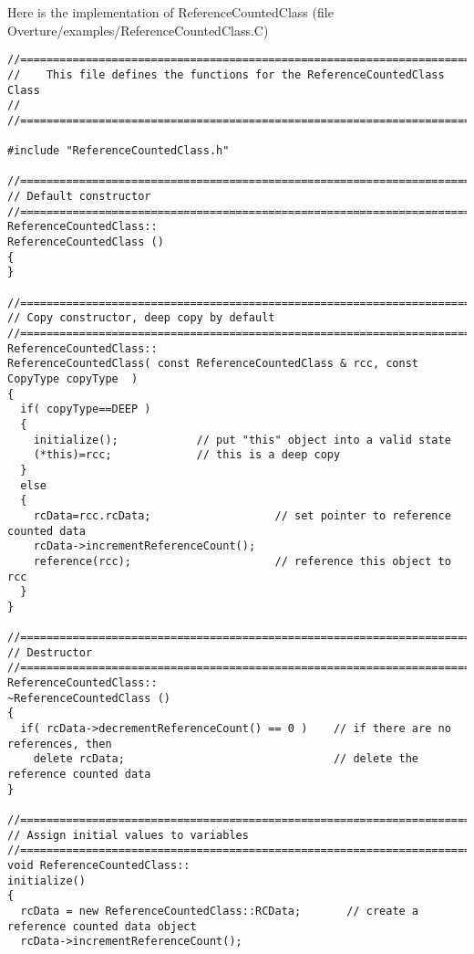 Here is the implementation of {\ff ReferenceCountedClass}
(file {\ff Overture/examples/Reference\-Counted\-Class.C})
{\footnotesize
\begin{verbatim}
//========================================================================================================
//    This file defines the functions for the ReferenceCountedClass Class
//
//========================================================================================================

#include "ReferenceCountedClass.h"

//========================================================================================================
// Default constructor
//========================================================================================================
ReferenceCountedClass::
ReferenceCountedClass ()
{
}

//========================================================================================================
// Copy constructor, deep copy by default
//========================================================================================================
ReferenceCountedClass::
ReferenceCountedClass( const ReferenceCountedClass & rcc, const CopyType copyType  )
{
  if( copyType==DEEP )  
  {
    initialize();            // put "this" object into a valid state
    (*this)=rcc;             // this is a deep copy
  }
  else
  {
    rcData=rcc.rcData;                   // set pointer to reference counted data
    rcData->incrementReferenceCount();   
    reference(rcc);                      // reference this object to rcc
  }
}

//========================================================================================================
// Destructor
//========================================================================================================
ReferenceCountedClass::
~ReferenceCountedClass ()
{
  if( rcData->decrementReferenceCount() == 0 )    // if there are no references, then
    delete rcData;                                // delete the reference counted data
}

//========================================================================================================
// Assign initial values to variables
//========================================================================================================
void ReferenceCountedClass::
initialize()  
{
  rcData = new ReferenceCountedClass::RCData;       // create a reference counted data object
  rcData->incrementReferenceCount();


\end{verbatim}}
